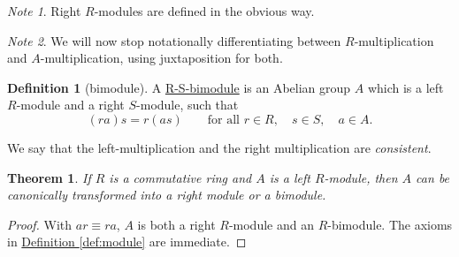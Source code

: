 \documentclass[a4paper]{report}
\newcommand{\defn}[1]{\ul{#1}}
\theoremstyle{definition}
\newtheorem{definition}{Definition}[section]
\theoremstyle{plain}
\newtheorem{theorem}{Theorem}[section]
\theoremstyle{remark}
\newtheorem{note}{Note}[section]
\begin{document}
\begin{note}
  Right $R$-modules are defined in the obvious way.
\end{note}

\begin{note}
  We will now stop notationally differentiating between $R$-multiplication and $A$-multiplication, using juxtaposition for both.
\end{note}

\begin{definition}[bimodule]
  \label{def:bimodule}
  A \defn{R-S-bimodule} is an Abelian group $A$ which is a left $R$-module and a right $S$-module, such that 
  \begin{equation*}
    (ra)s = r(as)\qquad\text{for all } r\in R,\quad s\in S,\quad a\in A.
  \end{equation*}

  We say that the left-multiplication and the right multiplication are \emph{consistent}.
\end{definition}

\begin{theorem}
  \label{thm:leftmoduletransformstoothermodules}
  If $R$ is a commutative ring and $A$ is a left $R$-module, then $A$ can be canonically transformed into a right module or a bimodule.
\end{theorem}
\begin{proof}
  With $ar \equiv ra$, $A$ is both a right $R$-module and an $R$-bimodule. The axioms in \hyperref[def:module]{Definition \ref*{def:module}} are immediate.
\end{proof}
\end{document}
